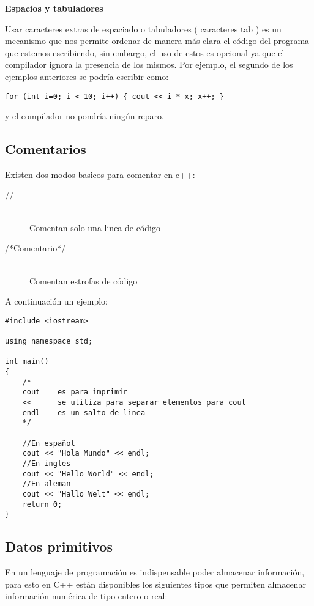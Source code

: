 \textbf{Espacios y tabuladores}

Usar caracteres extras de espaciado o tabuladores ( caracteres tab ) es un mecanismo que nos permite ordenar de manera más clara el código del programa que estemos escribiendo, sin embargo, el uso de estos es opcional ya que el compilador ignora la presencia de los mismos. Por ejemplo, el segundo de los ejemplos anteriores se podría escribir como:

\begin{lstlisting}[style=Cpp, label=sintaxis, caption=Sintaxis]
for (int i=0; i < 10; i++) { cout << i * x; x++; }
\end{lstlisting}

y el compilador no pondría ningún reparo.


\subsection{Comentarios}

Existen dos modos basicos para comentar en c++:
\begin{description}
\item [//] \hfill \\
Comentan solo una linea de código 
\item [/*Comentario*/] \hfill \\
Comentan estrofas de código
\end{description}

A continuación un ejemplo:

\begin{lstlisting}[style=Cpp, label=comentarios, caption=Comentarios]
#include <iostream>

using namespace std;

int main()
{
    /*
    cout    es para imprimir
    <<      se utiliza para separar elementos para cout
    endl    es un salto de linea
    */

    //En español
    cout << "Hola Mundo" << endl;
    //En ingles
    cout << "Hello World" << endl;
    //En aleman
    cout << "Hallo Welt" << endl;
    return 0;
}
\end{lstlisting}

\subsection{Datos primitivos}

En un lenguaje de programación es indispensable poder almacenar información, para esto en C++ están disponibles los siguientes tipos que permiten almacenar información numérica de tipo entero o real:

